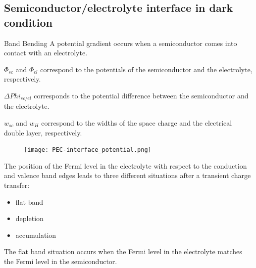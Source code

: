 \documentclass[10pt,compress,handout]{beamer}
\begin{document}
\subsection{Semiconductor/electrolyte interface in dark condition}
    \begin{frame}[allowframebreaks=1.0]{Band Bending}
            A potential gradient occurs when a semiconductor comes into contact with an 
            electrolyte.
            
            $\Phi_{sc}$ and $\Phi_{el}$ correspond to the 
            potentials of the semiconductor and the electrolyte, respectively. 
            
            $\Delta Phi _{sc/el}$ corresponds to the potential difference between 
            the semiconductor and the electrolyte. 
            
            $w_{sc}$ and $w_{H}$ correspond to 
            the widths of the space charge and the electrical double layer, 
            respectively.

        \begin{figure}[h]
            \centering
            \texttt{[image: PEC-interface\_potential.png]}
            \label{fig_interface_potential}
        \end{figure}

        \framebreak
            
        The position of the Fermi level in the electrolyte with respect to the 
        conduction and valence band edges leads to three different situations after 
         a transient charge transfer:
        \begin{itemize}
            \item flat band
            \item depletion
            \item accumulation
        \end{itemize}
        
        The flat band situation occurs when the Fermi level in the electrolyte 
        matches the Fermi level in the semiconductor. 
        

\end{frame}
\end{document}
